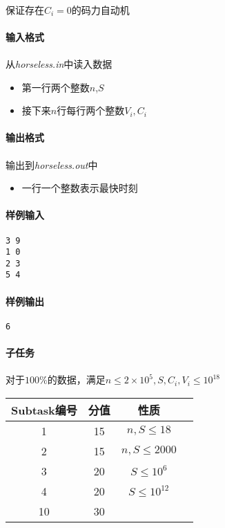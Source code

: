\documentclass[UTF8]{ctexart}
\begin{document}
\paragraph{}保证存在$C_i=0$的码力自动机

\paragraph{输入格式}
\paragraph{}从\emph{horseless.in}中读入数据
\begin{itemize}
\item 第一行两个整数$n$,$S$
\item 接下来$n$行每行两个整数$V_i,C_i$
\end{itemize}
\paragraph{输出格式}
\paragraph{}输出到\emph{horseless.out}中
\begin{itemize}
	\item 一行一个整数表示最快时刻
\end{itemize}
\paragraph{样例输入}
\begin{lstlisting}
3 9
1 0
2 3
5 4
\end{lstlisting}
\paragraph{样例输出}
\begin{lstlisting}
6
\end{lstlisting}
\paragraph{子任务}
\paragraph{}对于$100\%$的数据，满足$n\le 2\times 10^5,S,C_i,V_i\le 10^{18}$
\begin{center}
	\begin{tabular}{|c|c|c|c|}
		\hline
		Subtask编号&分值&性质\\
		\hline
		1&15&$n,S\le 18$\\
		\hline
		2&15&$n,S\le 2000$\\
		\hline
		3&20&$S\le 10^6$\\
		\hline
		4&20&$S\le 10^{12}$\\
		\hline
		10&30&\\
		\hline
	\end{tabular}	
\end{center}
\end{document}
